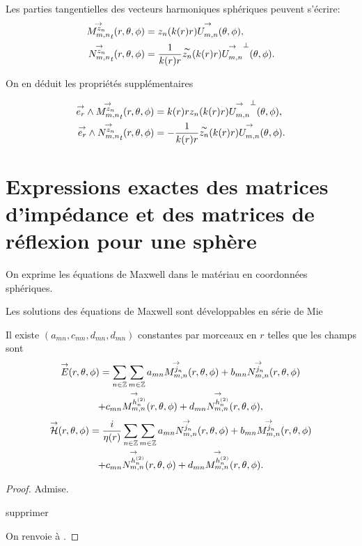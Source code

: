     \begin{prop}
        Les parties tangentielles des vecteurs harmoniques sphériques peuvent s'écrire:
        \begin{align*}
          \Mmn[z_n]_t(\rtp) &= z_n(k(r)r)\Umn(\tp),
          \\
          \Nmn[z_n]_t(\rtp) &= \frac{1}{k(r)r}\tilde{z_n}(k(r)r)\Umn^\perp(\tp).
        \end{align*}
    \end{prop}

    On en déduit les propriétés supplémentaires
    \begin{prop}
        \label{prop:Mmn_Nmn_vect}
        \begin{align*}
          \vect{e_r} \pvect \Mmn[z_n]_t(\rtp) &= k(r)rz_n(k(r)r)\Umn^\perp(\tp),
          \\
          \vect{e_r} \pvect \Nmn[z_n]_t(\rtp) &= -\frac{1}{k(r)r}\tilde{z_n}(k(r)r)\Umn(\tp).
        \end{align*}
    \end{prop}

\section[Opérateur de Calderón pour une sphère]{Expressions exactes des matrices d'impédance et des matrices de réflexion pour une sphère}

    \begin{figure}[!hbt]
        \centering
        \begin{tikzpicture}
              
        \end{tikzpicture}
    \end{figure}

    On exprime les équations de Maxwell dans le matériau en coordonnées sphériques.

    Les solutions des équations de Maxwell sont développables en série de Mie
    \begin{prop}
        Il existe \((a_{mn},c_{mn},d_{mn},d_{mn})\) constantes par morceaux en \(r\) telles que les champs sont
        \begin{multline*}
            \vE(\rtp) = \sum_{n\in\ZZ}\sum_{m\in\ZZ} a_{mn} \Mmn[j_n](\rtp) + b_{mn} \Nmn[j_n](\rtp)
            \\
            + c_{mn} \Mmn[h^{(2)}_n](\rtp) + d_{mn} \Nmn[h^{(2)}_n](\rtp),
        \end{multline*}
        \begin{multline*}
            \vH(\rtp) = \frac{i}{\eta(r)}\sum_{n\in\ZZ}\sum_{m\in\ZZ} a_{mn} \Nmn[j_n](\rtp) + b_{mn} \Mmn[j_n](\rtp)
            \\
            + c_{mn} \Nmn[h^{(2)}_n](\rtp) + d_{mn} \Mmn[h^{(2)}_n](\rtp).
        \end{multline*}
    \end{prop}
    \begin{proof}
        Admise.
\begin{REM}
  supprimer
\end{REM} 
        On renvoie à \cite{cheng_spectral_1993}.
    \end{proof}

